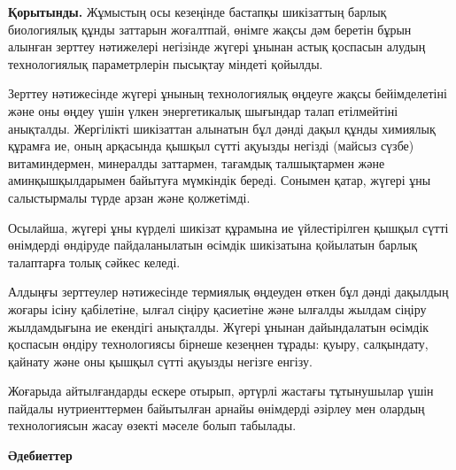 \begin{multicols}{2}
{\bfseries Қорытынды.} Жұмыстың осы кезеңінде бастапқы шикізаттың барлық
биологиялық құнды заттарын жоғалтпай, өнімге жақсы дәм беретін бұрын
алынған зерттеу нәтижелері негізінде жүгері ұнынан астық қоспасын алудың
технологиялық параметрлерін пысықтау міндеті қойылды.

Зерттеу нәтижесінде жүгері ұнының технологиялық өңдеуге жақсы
бейімделетіні және оны өңдеу үшін үлкен энергетикалық шығындар талап
етілмейтіні анықталды. Жергілікті шикізаттан алынатын бұл дәнді дақыл
құнды химиялық құрамға ие, оның арқасында қышқыл сүтті ақуызды негізді
(майсыз сүзбе) витаминдермен, минералды заттармен, тағамдық талшықтармен
және аминқышқылдарымен байытуға мүмкіндік береді. Сонымен қатар, жүгері
ұны салыстырмалы түрде арзан және қолжетімді.

Осылайша, жүгері ұны күрделі шикізат құрамына ие үйлестірілген қышқыл
сүтті өнімдерді өндіруде пайдаланылатын өсімдік шикізатына қойылатын
барлық талаптарға толық сәйкес келеді.

Алдыңғы зерттеулер нәтижесінде термиялық өңдеуден өткен бұл дәнді
дақылдың жоғары ісіну қабілетіне, ылғал сіңіру қасиетіне және ылғалды
жылдам сіңіру жылдамдығына ие екендігі анықталды. Жүгері ұнынан
дайындалатын өсімдік қоспасын өндіру технологиясы бірнеше кезеңнен
тұрады: қуыру, салқындату, қайнату және оны қышқыл сүтті ақуызды негізге
енгізу.

Жоғарыда айтылғандарды ескере отырып, әртүрлі жастағы тұтынушылар үшін
пайдалы нутриенттермен байытылған арнайы өнімдерді әзірлеу мен олардың
технологиясын жасау өзекті мәселе болып табылады.
\end{multicols}

\begin{center}
{\bfseries Әдебиеттер}
\end{center}

